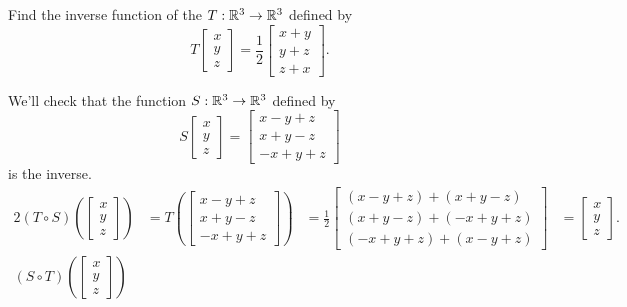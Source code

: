 \begin{example}
	Find the inverse function of the $T: \mathbb{R}^3 \to \mathbb{R}^3$ defined by
	\begin{equation*}
		T\begin{bmatrix}
			x \\ y \\ z
		\end{bmatrix} = \frac{1}{2}\begin{bmatrix}
			x+y \\ y+z \\ z+x
		\end{bmatrix}.
	\end{equation*}
\end{example}
\begin{answer}
	We'll check that the function $S: \mathbb{R}^3 \to \mathbb{R}^3$ defined by
	\begin{equation*}
		S\begin{bmatrix}
			x \\ y \\ z
		\end{bmatrix} = \begin{bmatrix}
			x-y+z \\ x+y-z \\ -x+y+z
		\end{bmatrix}
	\end{equation*}
	is the inverse.
	\begin{alignat*}{2}
		(T \circ S)\left(\begin{bmatrix} x \\ y \\ z\end{bmatrix}\right)
		&= T\left(\begin{bmatrix} x-y+z \\ x+y-z \\ -x+y+z \end{bmatrix}\right) 
		&= \frac{1}{2} \begin{bmatrix} (x-y+z)+(x+y-z) \\ (x+y-z)+(-x+y+z) \\ (-x+y+z)+(x-y+z)\end{bmatrix} 
		&= \begin{bmatrix} x \\ y \\ z \end{bmatrix}. \\
		(S \circ T)\left(\begin{bmatrix} x \\ y \\ z \end{bmatrix}\right)

\end{alignat*}
\end{answer}
